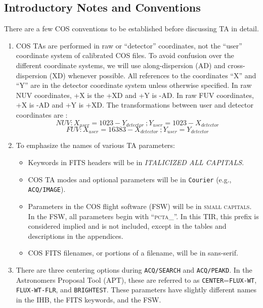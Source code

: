 \documentclass[12pt]{reportj}
\begin{document}
\subsection{Introductory Notes and Conventions}
\vspace{-0.3cm}
There are a few COS conventions to be established before discussing TA in detail.
\begin{enumerate}
	\item{COS TAs are performed in raw or ``detector'' coordinates, not the ``user'' coordinate system of calibrated
		COS files. To avoid confusion over the different coordinate systems, we will use along-dispersion (AD) and cross-dispersion
		(XD) whenever possible.
		All references to the coordinates ``X'' and ``Y'' are in the detector coordinate system unless otherwise
		specified.
		In raw NUV coordinates, +X is the +XD and +Y is -AD. In raw FUV coordinates, +X is -AD and +Y is +XD.
		The transformations between user and detector coordinates are :
		\begin{equation} NUV: X_{user} = 1023 - Y_{detector} \ ; Y_{user} = 1023-X_{detector} \end{equation}
		\begin{equation} FUV: X_{user} = 16383 - X_{detector} \ ; Y_{user} = Y_{detector} \end{equation}
		}
	\item{To emphasize the names of various TA parameters:
		\begin{itemize}
			\item{Keywords in FITS headers will be in \textit{ITALICIZED ALL CAPITALS}.}
			\item{COS TA modes and optional parameters will be in \texttt{Courier} (e.g., 	\texttt{ACQ/IMAGE}).}
			\item{Parameters in the COS flight software (FSW) will be in \textsc{small capitals}.
In the FSW, all parameters begin with ``\textsc{pcta\_}''. In this TIR, this prefix is considered implied and is not included,
except in the tables and descriptions in the appendices.}
			\item{COS FITS filenames, or portions of a filename, will be in {\sf sans-serif}.}
		\end{itemize}
	}
	\item{There are three centering options during \texttt{ACQ/SEARCH} and \texttt{ACQ/PEAKD}. In the Astronomers Proposal Tool (APT), these are
		referred to as \texttt{CENTER}=\texttt{FLUX-WT}, \texttt{FLUX-WT-FLR}, and \texttt{BRIGHTEST}.
		These parameters have slightly different names in the IHB, the FITS keywords, and the FSW.
}
\end{enumerate}
\end{document}

